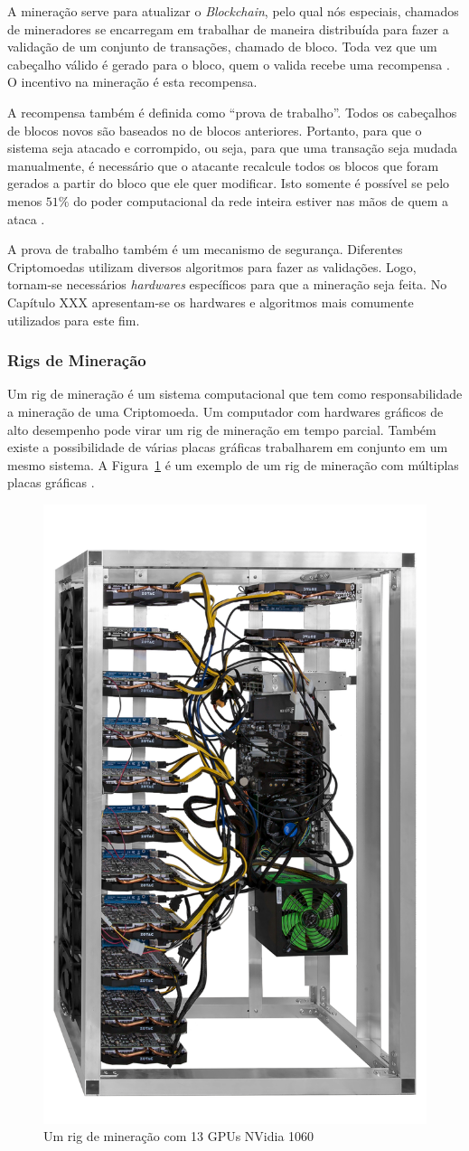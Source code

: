 \documentclass[
article,			%
12pt,				%
openright,			%
oneside,			%
a4paper,			%
chapter=TITLE,		%
section=TITLE,		%
subsection=TITLE,	%
subsubsection=TITLE,%
subsubsubsection=TITLE, %
english,			%
brazil,				%
]{abntex2}
\begin{document}
A mineração serve para atualizar o \emph{Blockchain}, pelo qual nós
especiais, chamados de mineradores se encarregam em trabalhar de
maneira distribuída para fazer a validação de um conjunto de
transações, chamado de bloco. Toda vez que um cabeçalho válido é
gerado para o bloco, quem o valida recebe uma recompensa
\cite{LChicarino}. O incentivo na mineração é esta recompensa.

A recompensa também é definida como ``prova de trabalho''. Todos os
cabeçalhos de blocos novos são baseados no de blocos anteriores.
Portanto, para que o sistema seja atacado e corrompido, ou seja, para
que uma transação seja mudada manualmente, é necessário que o atacante
recalcule todos os blocos que foram gerados a partir do bloco que ele
quer modificar. Isto somente é possível se pelo menos $51\%$ do poder
computacional da rede inteira estiver nas mãos de quem a ataca
\cite{Nakamoto2008, Dev2014}.

A prova de trabalho também é um mecanismo de segurança. Diferentes
Criptomoedas utilizam diversos algoritmos para fazer as validações.
Logo, tornam-se necessários \emph{hardwares} específicos para que a
mineração seja feita. No Capítulo XXX apresentam-se os hardwares e
algoritmos mais comumente utilizados para este fim.


\subsubsection{Rigs de Mineração}

Um rig de mineração é um sistema computacional que tem como
responsabilidade a mineração de uma Criptomoeda. Um computador com
hardwares gráficos de alto desempenho pode virar um rig de mineração
em tempo parcial. Também existe a possibilidade de várias placas
gráficas trabalharem em conjunto em um mesmo sistema. A
Figura~\ref{fig:rig_mineracao} é um exemplo de um rig de mineração com
múltiplas placas gráficas \cite{BitcoinWiki2015}.

\begin{figure}[!htbp]
    \caption{\label{fig:rig_mineracao}Um rig de mineração com 13 GPUs
    NVidia 1060}
    \begin{center}
        \includegraphics[width=.3\linewidth]{rig_mineracao.png}
    \end{center}
\end{figure}
\end{document}
